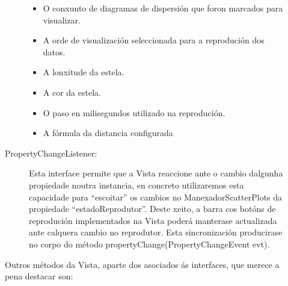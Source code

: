 \begin{description}
\begin{description}
\begin{itemize}
\item O conxunto de diagramas de dispersión que foron marcados para visualizar.
\item A orde de visualización seleccionada para a reprodución dos datos.
\item A lonxitude da estela.
\item A cor da estela.
\item O paso en milisegundos utilizado na reprodución.
\item A fórmula da distancia configurada
\end{itemize}

\item[PropertyChangeListener:] \hfill
Esta interface permite que a Vista reaccione ante o cambio dalgunha propiedade noutra instancia, en concreto utilizaremos esta capacidade para ``escoitar'' os cambios no ManexadorScatterPlots da propiedade ``estadoReprodutor''. Deste xeito, a barra cos botóns de reprodución implementados na Vista poderá manterase actualizada ante calquera cambio no reprodutor. Esta sincronización producirase no corpo do método propertyChange(PropertyChangeEvent evt).
\end{description}

Outros métodos da Vista, aparte dos asociados ás interfaces, que merece a pena destacar son:


\end{description}
